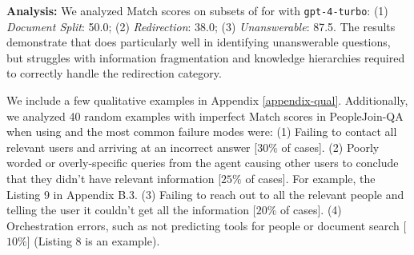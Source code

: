 \noindent \textbf{Analysis:}
We analyzed Match scores on subsets of \dataspider{} for \reactagent{} with \texttt{gpt-4-turbo}: 
(1) \emph{Document Split}: 50.0; 
(2) \emph{Redirection}: 38.0;
(3) \emph{Unanswerable}: 87.5. 
The results demonstrate that \reactagent{} does particularly well in identifying unanswerable questions, but struggles with information fragmentation and knowledge hierarchies required to correctly handle the redirection category. 

We include a few qualitative examples in Appendix \ref{appendix-qual}. Additionally, we analyzed 40 random examples with imperfect Match scores in PeopleJoin-QA when using \reactagent{} and the most common failure modes were: (1) Failing to contact all  relevant users and arriving at an incorrect answer [$30\%$ of cases]. %
(2) Poorly worded or overly-specific queries from the agent causing other users to conclude that they didn’t have relevant information [$25\%$ of cases]. For example, the Listing 9 in Appendix B.3. (3) Failing to reach out to all the relevant people and telling the user it couldn’t get all the information [$20\%$ of cases]. 
(4) Orchestration errors, such as not predicting tools for people or document search [$10\%$] (Listing 8 is an example). %



